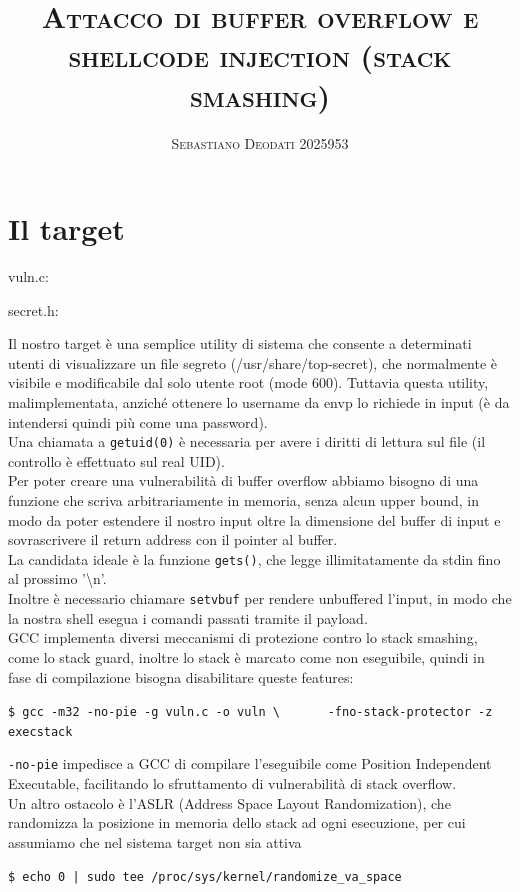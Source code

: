 \documentclass[a4paper,12pt]{report}
\title{\textsc{Attacco di buffer overflow e shellcode injection (stack smashing)}}
\author{\textsc{Sebastiano Deodati 2025953}}
\begin{document}
\maketitle

\vspace{24pt}
\section*{Il target}

	\small
	vuln.c:
	{
		\fontsize{8}{10}\selectfont
		
	}
	\vspace{24pt}
	\small
	secret.h:
	{
		\fontsize{8}{10}\selectfont
		
	}
	\normalsize
	Il nostro target è una semplice utility di sistema che consente a determinati utenti di visualizzare un file segreto (/usr/share/top-secret), che normalmente è visibile e modificabile dal solo utente root (mode 600). Tuttavia questa utility, malimplementata, anziché ottenere lo username da envp lo richiede in input (è da intendersi quindi più come una password). \\
	Una chiamata a \texttt{getuid(0)} è necessaria per avere i diritti di lettura sul file (il controllo è effettuato sul real UID). \\
	Per poter creare una vulnerabilità di buffer overflow abbiamo bisogno di una funzione che scriva arbitrariamente in memoria, senza alcun upper bound, in modo da poter estendere il nostro input oltre la dimensione del buffer di input e sovrascrivere il return address con il pointer al buffer. \\
	La candidata ideale è la funzione \texttt{gets()}, che legge illimitatamente da stdin fino al prossimo '\textbackslash{}n'. \\
	Inoltre è necessario chiamare \texttt{setvbuf} per rendere unbuffered l'input, in modo che la nostra shell esegua i comandi passati tramite il payload. \\
	GCC implementa diversi meccanismi di protezione contro lo stack smashing, come lo stack guard, inoltre lo stack è marcato come non eseguibile, quindi in fase di compilazione bisogna disabilitare queste features:
	\begin{commandbox}
		\verb#$ gcc -m32 -no-pie -g vuln.c -o vuln \ # \newline
		\verb#     -fno-stack-protector -z execstack#
	\end{commandbox}
	\texttt{-no-pie} impedisce a GCC di compilare l'eseguibile come Position Independent Executable, facilitando lo sfruttamento di vulnerabilità di stack overflow. \\
	Un altro ostacolo è l'ASLR (Address Space Layout Randomization), che randomizza la posizione in memoria dello stack ad ogni esecuzione, per cui assumiamo che nel sistema target non sia attiva
	\begin{commandbox}
		\verb#$ echo 0 | sudo tee /proc/sys/kernel/randomize_va_space#
	\end{commandbox}
\end{document}
